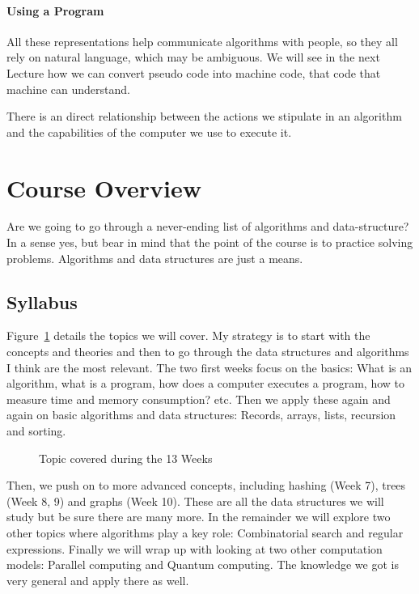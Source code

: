 \documentclass{aldast}
\begin{document}
\paragraph{Using a Program} All these representations help communicate
algorithms with people, so they all rely on natural language, which
may be ambiguous. We will see in the next Lecture how we can convert
pseudo code into machine code, that code that machine can understand.

\begin{takeaway}
  There is an direct relationship between the actions we stipulate in
  an algorithm and the capabilities of the computer we use to execute
  it.
\end{takeaway}


\section{Course Overview}

Are we going to go through a never-ending list of algorithms and
data-structure? In a sense yes, but bear in mind that the point of the
course is to practice solving problems. Algorithms and data
structures are just a means.

\subsection{Syllabus}

Figure~\ref{fig:syllabus} details the topics we will cover. My
strategy is to start with the concepts and theories and then to go
through the data structures and algorithms I think are the most
relevant. The two first weeks focus on the basics: What is an
algorithm, what is a program, how does a computer executes a program,
how to measure time and memory consumption? etc. Then we apply these
again and again on basic algorithms and data structures: Records,
arrays, lists, recursion and sorting.

\begin{figure}[htbp]
  \begin{center}
    
  \end{center}
  \caption{Topic covered during the 13 Weeks}
  \label{fig:syllabus}
\end{figure}

Then, we push on to more advanced concepts, including hashing (Week
7), trees (Week 8, 9) and graphs (Week 10). These are all the data
structures we will study but be sure there are many more. In the
remainder we will explore two other topics where algorithms play a key
role: Combinatorial search and regular expressions. Finally we will
wrap up with looking at two other computation models: Parallel
computing and Quantum computing. The knowledge we got is very general
and apply there as well.
\end{document}
